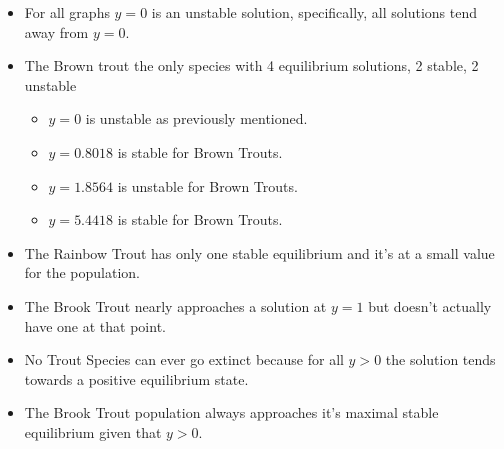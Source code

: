 \documentclass[letterpaper,12pt]{article}
\begin{document}
\begin{itemize}
    \item For all graphs \(y = 0\) is an unstable solution, specifically, all solutions tend away from \(y = 0\).
    \item The Brown trout the only species with 4 equilibrium solutions, 2 stable, 2 unstable 
        \begin{itemize}
            \item \(y = 0\) is unstable as previously mentioned.
            \item \(y = 0.8018\) is stable for Brown Trouts.
            \item \(y = 1.8564\) is unstable for Brown Trouts.
            \item \(y = 5.4418\) is stable for Brown Trouts.
        \end{itemize}
    \item The Rainbow Trout has only one stable equilibrium and it's at a small value for the population.
    \item The Brook Trout nearly approaches a solution at \(y = 1\) but doesn't actually have one at that point.
    \item No Trout Species can ever go extinct because for all \(y > 0\) the solution tends towards a positive equilibrium state.
    \item The Brook Trout population always approaches it's maximal stable equilibrium given that \(y > 0\).
\end{itemize}
\end{document}
